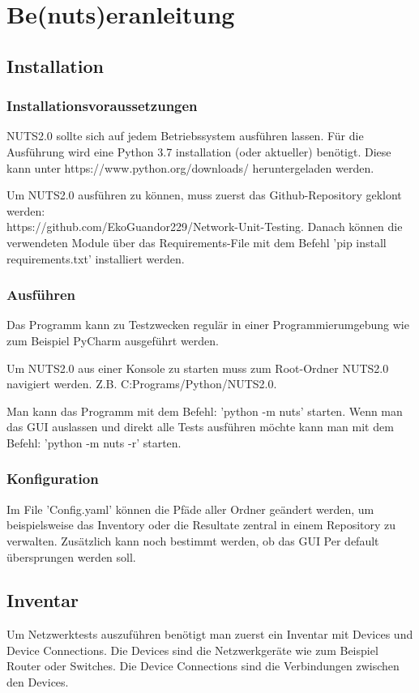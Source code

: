 \documentclass[]{subfiles}
\begin{document}
\section{Be(nuts)eranleitung}
\subsection{Installation}
	\subsubsection{Installationsvoraussetzungen}
	NUTS2.0 sollte sich auf jedem Betriebssystem ausführen lassen.
	Für die Ausführung wird eine Python 3.7 installation (oder aktueller) benötigt.
	Diese kann unter https://www.python.org/downloads/ heruntergeladen werden.

	Um NUTS2.0 ausführen zu können, muss zuerst das Github-Repository geklont werden:\\
	https://github.com/EkoGuandor229/Network-Unit-Testing. 
	Danach können die verwendeten Module über das Requirements-File mit dem Befehl
	'pip install requirements.txt' installiert werden.

	\subsubsection{Ausführen}
	Das Programm kann zu Testzwecken regulär in einer Programmierumgebung 
	wie zum Beispiel PyCharm ausgeführt werden.

	Um NUTS2.0 aus einer Konsole zu starten muss zum Root-Ordner NUTS2.0 navigiert werden. 
	Z.B. C:Programs/Python/NUTS2.0.

	Man kann das Programm mit dem Befehl: 'python -m nuts' starten. 
	Wenn man das GUI auslassen und direkt alle Tests ausführen möchte kann
	man mit dem Befehl: 'python -m nuts -r' starten.

	\subsubsection{Konfiguration}
	Im File 'Config.yaml' können die Pfäde aller Ordner geändert werden, um beispielsweise
	das Inventory oder die Resultate zentral in einem Repository zu verwalten. 
	Zusätzlich kann noch bestimmt werden, ob das GUI Per default übersprungen werden soll.

	\newpage

\subsection{Inventar}
	Um Netzwerktests auszuführen benötigt man zuerst ein Inventar mit Devices und 
	Device Connections.
	Die Devices sind die Netzwerkgeräte wie zum Beispiel Router oder Switches.
	Die Device Connections sind die Verbindungen zwischen den Devices.
\end{document}
